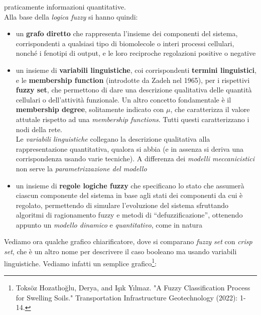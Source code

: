 \documentclass[a4paper,12pt, oneside]{book}
\begin{document}
praticamente informazioni quantitative.\\
Alla base della \textit{logica fuzzy} si hanno quindi:
\begin{itemize}
  \item un \textbf{grafo diretto} che rappresenta l'insieme dei componenti del
  sistema, corrispondenti a qualsiasi tipo di biomolecole o interi processi
  cellulari, nonché i fenotipi di output, e le loro reciproche regolazioni
  positive o negative  
  \item un insieme di \textbf{variabili linguistiche}, coi corrispondenti
  \textbf{termini linguistici}, e le \textbf{membership function} (introdotte da
  Zadeh nel 1965), per i
  rispettivi \textbf{fuzzy set}, che permettono di dare una descrizione
  qualitativa delle quantità cellulari o dell'attività funzionale. Un altro
  concetto fondamentale è il \textbf{membership degree}, solitamente indicato
  con $\mu$, che caratterizza il valore attutale rispetto ad una
  \textit{membership functions}. Tutti questi caratterizzano i nodi della
  rete.\\ 
  Le \textit{variabili linguistiche} collegano la descrizione qualitativa alla
  rappresentazione quantitativa, qualora si abbia (e in assenza si deriva una
  corrispondenza usando varie tecniche). A differenza dei \textit{modelli
    meccanicistici} non serve la \textit{parametrizzazione del modello}
  \item un insieme di \textbf{regole logiche fuzzy} che specificano lo stato che
  assumerà ciascun componente del sistema in base agli stati dei componenti da
  cui è regolato, permettendo di simulare l'evoluzione del sistema sfruttando
  algoritmi di ragionamento fuzzy e metodi di ``defuzzificazione'', ottenendo
  appunto un \textit{modello dinamico} e \textit{quantitativo}, come in natura
\end{itemize}
\newpage
\noindent
Vediamo ora qualche grafico chiarificatore, dove si comparano \textit{fuzzy set}
con \textit{crisp set}, che è un altro nome per descrivere il caso booleano ma
usando variabili linguistiche. Vediamo infatti un semplice
grafico\footnote{Toksöz Hozatlıoğlu, Derya, and Işık Yılmaz. "A Fuzzy
  Classification Process for Swelling Soils." Transportation Infrastructure
  Geotechnology (2022): 1-14.}:
\end{document}
